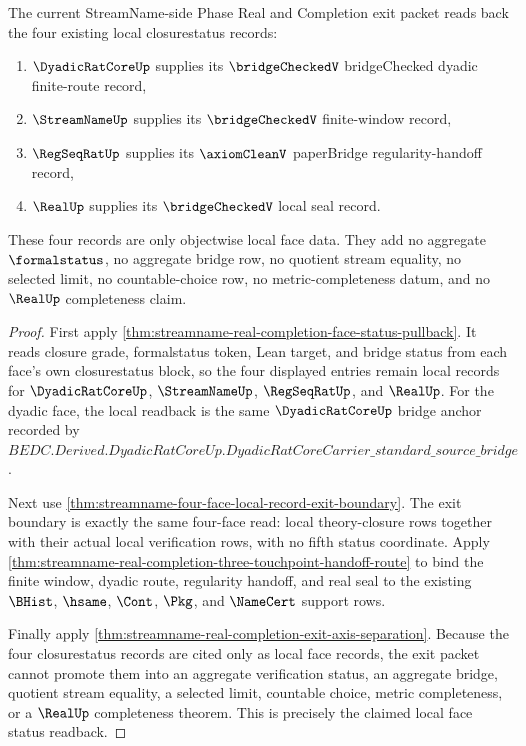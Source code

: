 \begin{theorem}
\label{thm:streamname-real-completion-local-face-status-readback}
The current StreamName-side Phase Real and Completion exit packet reads back the four existing local closurestatus records:
\begin{enumerate}
\item $\DyadicRatCoreUp$ supplies its $\bridgeCheckedV$ bridgeChecked dyadic finite-route record,
\item $\StreamNameUp$ supplies its $\bridgeCheckedV$ finite-window record,
\item $\RegSeqRatUp$ supplies its $\axiomCleanV$ paperBridge regularity-handoff record,
\item $\RealUp$ supplies its $\bridgeCheckedV$ local seal record.
\end{enumerate}
These four records are only objectwise local face data. They add no aggregate $\formalstatus$, no aggregate bridge row, no quotient stream equality, no selected limit, no countable-choice row, no metric-completeness datum, and no $\RealUp$ completeness claim.
\end{theorem}
\begin{proof}
First apply \autoref{thm:streamname-real-completion-face-status-pullback}. It reads closure grade, formalstatus token, Lean target, and bridge status from each face's own closurestatus block, so the four displayed entries remain local records for $\DyadicRatCoreUp$, $\StreamNameUp$, $\RegSeqRatUp$, and $\RealUp$. For the dyadic face, the local readback is the same $\DyadicRatCoreUp$ bridge anchor recorded by $BEDC.Derived.DyadicRatCoreUp.DyadicRatCoreCarrier\_standard\_source\_bridge$.

Next use \autoref{thm:streamname-four-face-local-record-exit-boundary}. The exit boundary is exactly the same four-face read: local theory-closure rows together with their actual local verification rows, with no fifth status coordinate. Apply \autoref{thm:streamname-real-completion-three-touchpoint-handoff-route} to bind the finite window, dyadic route, regularity handoff, and real seal to the existing $\BHist$, $\hsame$, $\Cont$, $\Pkg$, and $\NameCert$ support rows.

Finally apply \autoref{thm:streamname-real-completion-exit-axis-separation}. Because the four closurestatus records are cited only as local face records, the exit packet cannot promote them into an aggregate verification status, an aggregate bridge, quotient stream equality, a selected limit, countable choice, metric completeness, or a $\RealUp$ completeness theorem. This is precisely the claimed local face status readback.
\end{proof}

